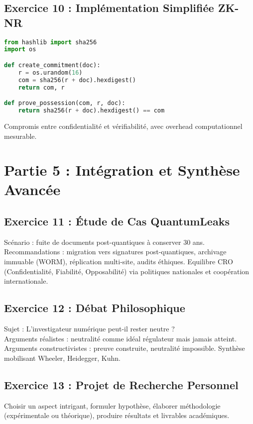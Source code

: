 \documentclass[12pt,a4paper]{article}
\begin{document}
\subsection*{Exercice 10 : Implémentation Simplifiée ZK-NR}
\begin{lstlisting}[language=Python]
from hashlib import sha256
import os

def create_commitment(doc):
    r = os.urandom(16)
    com = sha256(r + doc).hexdigest()
    return com, r

def prove_possession(com, r, doc):
    return sha256(r + doc).hexdigest() == com
\end{lstlisting}
Compromis entre confidentialité et vérifiabilité, avec overhead computationnel mesurable.

\section*{Partie 5 : Intégration et Synthèse Avancée}

\subsection*{Exercice 11 : Étude de Cas QuantumLeaks}
Scénario : fuite de documents post-quantiques à conserver 30 ans. Recommandations : migration vers signatures post-quantiques, archivage immuable (WORM), réplication multi-site, audits éthiques. Equilibre CRO (Confidentialité, Fiabilité, Opposabilité) via politiques nationales et coopération internationale.

\subsection*{Exercice 12 : Débat Philosophique}
Sujet : \og L’investigateur numérique peut-il rester neutre ? \fg{} \\
Arguments réalistes : neutralité comme idéal régulateur mais jamais atteint. \\
Arguments constructivistes : preuve construite, neutralité impossible. Synthèse mobilisant Wheeler, Heidegger, Kuhn.

\subsection*{Exercice 13 : Projet de Recherche Personnel}
Choisir un aspect intrigant, formuler hypothèse, élaborer méthodologie (expérimentale ou théorique), produire résultats et livrables académiques.
\end{document}
